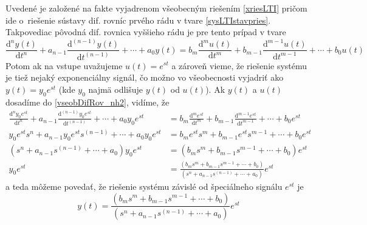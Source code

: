 \documentclass[a4paper, 10pt, ]{article}
\begin{document}
Uvedené je založené na fakte vyjadrenom všeobecným riešením \eqref{xriesLTI} pričom ide o~riešenie sústavy dif. rovníc prvého rádu v tvare \eqref{sysLTIstavpries}. Takpovediac pôvodná dif. rovnica vyššieho rádu je pre tento prípad v tvare
\begin{equation} \label{vseobDifRov_nh2}
	\frac{\text{d}^n y(t)}{\text{d}t^n} + a_{n-1} \frac{\text{d}^{(n-1)} y(t)}{\text{d}t^{(n-1)}} + \cdots + a_0 y(t) = b_m \frac{\text{d}^m u(t)}{\text{d}t^m} + b_{m-1} \frac{\text{d}^{m-1} u(t)}{\text{d}t^{m-1}} + \cdots + b_0 u(t)
\end{equation}
Potom ak na vstupe uvažujeme $u(t) = e^{st}$ a zároveň vieme, že riešenie systému je tiež nejaký exponenciálny signál, čo možno vo všeobecnosti vyjadriť ako $y(t) = y_0 e^{st}$ (kde $y_0$ najmä odlišuje $y(t)$ od $u(t)$). Ak $y(t)$ a $u(t)$ dosadíme do \eqref{vseobDifRov_nh2}, vidíme, že
\begin{equation}
    \begin{aligned}
                \frac{\text{d}^n y_0 e^{st}}{\text{d}t^n}
        + a_{n-1} \frac{\text{d}^{(n-1)} y_0 e^{st}}{\text{d}t^{(n-1)}}
        + \cdots
        + a_0 y_0 e^{st}
        &=
        b_m \frac{\text{d}^m e^{st}}{\text{d}t^m}
        + b_{m-1} \frac{\text{d}^{m-1} e^{st}}{\text{d}t^{m-1}}
        + \cdots
        + b_0 e^{st}
        \\
        y_0 e^{st} s^n
        + a_{n-1}  y_0 e^{st} s^{(n-1)}
        + \cdots
        + a_0 y_0 e^{st}
        &=
        b_m  e^{st} s^m
        + b_{m-1}  e^{st} s^{m-1}
        + \cdots
        + b_0 e^{st}
        \\
        \left(
            s^n
            + a_{n-1}   s^{(n-1)}
            + \cdots
            + a_0
        \right)
        y_0 e^{st}
        &=
        \left(
        b_m   s^m
        + b_{m-1}   s^{m-1}
        + \cdots
        + b_0
        \right)
        e^{st}
        \\
        y_0 e^{st}
        &=
        \frac{
        \left(
        b_m   s^m
        + b_{m-1}   s^{m-1}
        + \cdots
        + b_0
        \right)
        }{
        \left(
            s^n
            + a_{n-1}   s^{(n-1)}
            + \cdots
            + a_0
        \right)
        }
        e^{st}
    \end{aligned}
\end{equation}
a teda môžeme povedať, že riešenie systému závislé od špeciálneho signálu $e^{st}$ je
\begin{equation}
    y(t)
    =
    \frac{
    \left(
    b_m   s^m
    + b_{m-1}   s^{m-1}
    + \cdots
    + b_0
    \right)
    }{
    \left(
    s^n
    + a_{n-1}   s^{(n-1)}
    + \cdots
    + a_0
    \right)
    }
    e^{st}
\end{equation}
\end{document}
